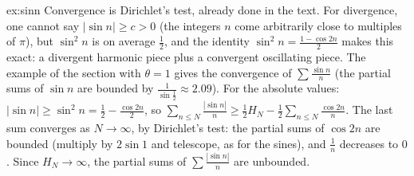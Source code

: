 \begin{solution}{ex:sinn}
\idea Convergence is Dirichlet's test, already done in the text. For divergence, one cannot say $|\sin n|\ge c>0$ (the integers $n$ come arbitrarily close to multiples of $\pi$), but $\sin^2n$ is on average $\frac12$, and the identity $\sin^2n=\frac{1-\cos2n}2$ makes this exact: a divergent harmonic piece plus a convergent oscillating piece.
\writeup The example of the section with $\theta=1$ gives the convergence of $\sum\frac{\sin n}n$ (the partial sums of $\sin n$ are bounded by $\frac1{\sin\frac12}\approx2.09$).
For the absolute values: $|\sin n|\ge\sin^2n=\frac12-\frac{\cos2n}2$, so $\sum_{n\le N}\frac{|\sin n|}n\ge\frac12H_N-\frac12\sum_{n\le N}\frac{\cos2n}n$. The last sum converges as $N\to\infty$, by Dirichlet's test: the partial sums of $\cos2n$ are bounded (multiply by $2\sin1$ and telescope, as for the sines), and $\frac1n$ decreases to $0$. Since $H_N\to\infty$, the partial sums of $\sum\frac{|\sin n|}n$ are unbounded.
\end{solution}

